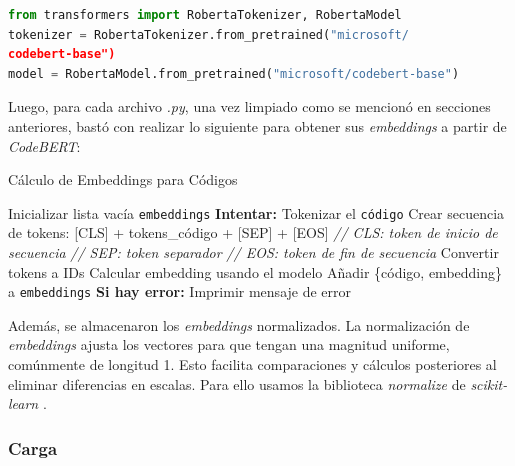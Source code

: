 \documentclass[11pt,a4paper,twoside,openany]{tesis}
\begin{document}
\begin{lstlisting}[language=Python]
from transformers import RobertaTokenizer, RobertaModel
tokenizer = RobertaTokenizer.from_pretrained("microsoft/
codebert-base")
model = RobertaModel.from_pretrained("microsoft/codebert-base")
\end{lstlisting}

Luego, para cada archivo \emph{.py}, una vez limpiado como se mencionó en secciones anteriores, bastó con realizar lo siguiente para obtener sus \emph{embeddings} a partir de \emph{CodeBERT}:

\begin{algorithm}
\caption{Cálculo de Embeddings para Códigos}
\begin{algorithmic}[1]
\State Inicializar lista vacía \texttt{embeddings}
    \State \textbf{Intentar:}
        \State Tokenizar el \texttt{código}
        \State Crear secuencia de tokens:
        \State \hspace{\algorithmicindent} [CLS] + tokens\_código + [SEP] + [EOS]
        \State \hspace{\algorithmicindent} \textit{// CLS: token de inicio de secuencia}
        \State \hspace{\algorithmicindent} \textit{// SEP: token separador}
        \State \hspace{\algorithmicindent} \textit{// EOS: token de fin de secuencia}
        \State Convertir tokens a IDs
        \State Calcular embedding usando el modelo
        \State Añadir \{código, embedding\} a \texttt{embeddings}
    \State \textbf{Si hay error:}
        \State Imprimir mensaje de error
\EndFor
\end{algorithmic}
\end{algorithm}

Además, se almacenaron los \emph{embeddings} normalizados. La normalización de \emph{embeddings} ajusta los vectores para que tengan una magnitud uniforme, comúnmente de longitud 1. Esto facilita comparaciones y cálculos posteriores al eliminar diferencias en escalas. Para ello usamos la biblioteca \emph{normalize} de \emph{scikit-learn} \cite{sklearn_normalize}.

\subsubsection{Carga} \textbf{ }
\end{document}
